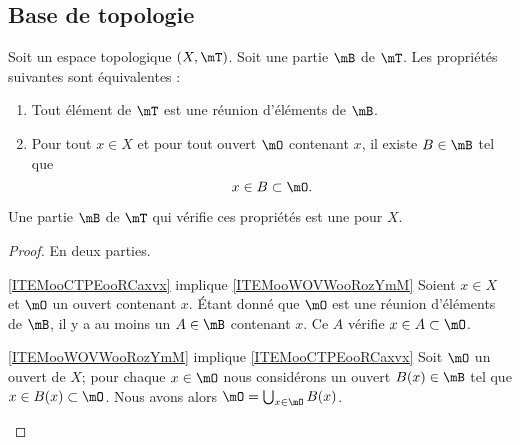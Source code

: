 \subsection{Base de topologie}

\begin{propositionDef}  \label{DEFooLEHPooIlNmpi}
    Soit un espace topologique \( (X,\mT)\). Soit une partie \( \mB\) de \( \mT\). Les propriétés suivantes sont équivalentes :
    \begin{enumerate}
        \item\label{ITEMooCTPEooRCaxvx}
            Tout élément de \( \mT\) est une réunion d'éléments de \( \mB\).
        \item       \label{ITEMooWOVWooRozYmM}
            Pour tout \( x\in X\) et pour tout ouvert \( \mO\) contenant \( x\), il existe \( B\in \mB\) tel que 
            \begin{equation}
                x\in B\subset \mO.
            \end{equation}
    \end{enumerate}
    Une partie \( \mB\) de \( \mT\) qui vérifie ces propriétés est une  pour \( X\).
\end{propositionDef}

\begin{proof}
    En deux parties.
    \begin{subproof}
    \item[\ref{ITEMooCTPEooRCaxvx} implique \ref{ITEMooWOVWooRozYmM}]
        Soient \( x\in X\) et \( \mO\) un ouvert contenant \( x\). Étant donné que \( \mO\) est une réunion d'éléments de \( \mB\), il y a au moins un \( A\in \mB\) contenant \( x\). Ce \( A\) vérifie \( x\in A\subset \mO\).
    \item[\ref{ITEMooWOVWooRozYmM} implique \ref{ITEMooCTPEooRCaxvx}]
        Soit \( \mO\) un ouvert de \( X\); pour chaque \( x\in\mO\) nous considérons un ouvert \( B(x)\in \mB\) tel que \( x\in B(x)\subset\mO\). Nous avons alors \( \mO=\bigcup_{x\in \mO}B(x)\).
    \end{subproof}
\end{proof}

